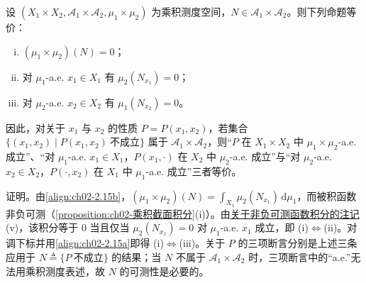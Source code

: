 \documentclass[../../main.tex]{subfiles}%
\begin{document}
\begin{remark}\label{remark:ch02-乘积a.e.等价}
设 $(X_1\times X_2,\mathscr A_1\times\mathscr A_2,\mu_1\times\mu_2)$ 为乘积测度空间，$N\in\mathscr A_1\times\mathscr A_2$。则下列命题等价：
\begin{enumerate}[(i)]
\item $(\mu_1\times\mu_2)(N)=0$；
\item 对 $\mu_1$-a.e. $x_1\in X_1$ 有 $\mu_2(N_{x_1})=0$；
\item 对 $\mu_2$-a.e. $x_2\in X_2$ 有 $\mu_1(N_{x_2})=0$。
\end{enumerate}
因此，对关于 $x_1$ 与 $x_2$ 的性质 $P=P(x_1,x_2)$，若集合 $\{(x_1,x_2)\mid P(x_1,x_2)\ \text{不成立}\}$ 属于 $\mathscr A_1\times\mathscr A_2$，则“$P$ 在 $X_1\times X_2$ 中 $\mu_1\times\mu_2$-a.e. 成立”、“对 $\mu_1$-a.e. $x_1\in X_1$，$P(x_1,\cdot)$ 在 $X_2$ 中 $\mu_2$-a.e. 成立”与“对 $\mu_2$-a.e. $x_2\in X_2$，$P(\cdot,x_2)$ 在 $X_1$ 中 $\mu_1$-a.e. 成立”三者等价。

证明。由\eqref{align:ch02-2.15b}，$(\mu_1\times\mu_2)(N)=\int_{X_1}\mu_2(N_{x_1})\,\mathrm{d}\mu_1$，而被积函数非负可测（\cref{proposition:ch02-乘积截面积分}(i)）。由\hyperref[remark:ch02-非负可测积分动机]{关于非负可测函数积分的注记}(v)，该积分等于 $0$ 当且仅当 $\mu_2(N_{x_1})=0$ 对 $\mu_1$-a.e. $x_1$ 成立，即 (i)$\Leftrightarrow$(ii)。对调下标并用\eqref{align:ch02-2.15a}即得 (i)$\Leftrightarrow$(iii)。关于 $P$ 的三项断言分别是上述三条应用于 $N\triangleq\{P\ \text{不成立}\}$ 的结果；当 $N$ 不属于 $\mathscr A_1\times\mathscr A_2$ 时，三项断言中的“a.e.”无法用乘积测度表述，故 $N$ 的可测性是必要的。
\end{remark}
\end{document}

